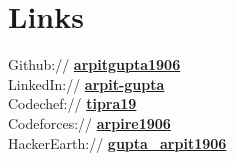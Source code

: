 \documentclass[]{deedy-resume-openfont}
\begin{document}
\begin{minipage}[t]{0.35\textwidth}

\section{Links}
Github:// \href{https://github.com/arpitgupta1906}{\bf arpitgupta1906} \\
LinkedIn://  \href{https://www.linkedin.com/in/arpit-gupta-46462819b/}{\bf arpit-gupta} \\
Codechef://  \href{https://www.codechef.com/users/tipra19}{\bf tipra19} \\
Codeforces:// \href{https://codeforces.com/profile/arpire1906}{\bf arpire1906} \\
HackerEarth:// \href{https://www.hackerrank.com/gupta_arpit0619}{\bf gupta\_arpit1906} 

%
%

\end{minipage}
\hfill
\end{document}
